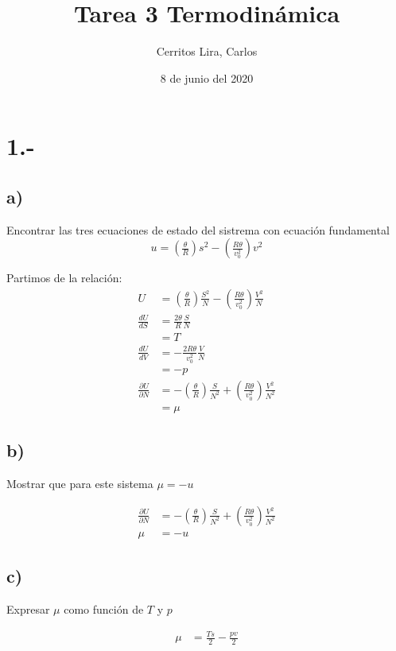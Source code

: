 \documentclass{article}
\title{Tarea 3 Termodinámica}
\author{Cerritos Lira, Carlos}
\date{8 de junio del 2020}
\begin{document}
\maketitle
\section*{1.-}
\subsection*{a)}
Encontrar las tres ecuaciones de estado del sistrema con ecuación fundamental
\[ u = (\tfrac{\theta}{R})s^2 - (\tfrac{R\theta}{v_0^2})v^2 \]
\begin{tcolorbox}
    Partimos de la relación:
    \begin{align*}
        U 
        &= (\tfrac{\theta}{R}) \tfrac{S^2}{N} - (\tfrac{R\theta}{v_0^2})\tfrac{V^2}{N} \\
        \tfrac{dU}{dS} 
        &= \tfrac{2\theta}{R}\tfrac{S}{N} \\
        &= T \\
        \tfrac{dU}{dV}
        &= -\tfrac{2R\theta}{v_0^2}\tfrac{V}{N} \\
        &= -p \\
        \tfrac{\partial U}{\partial N} 
        &= -(\tfrac{\theta}{R})\tfrac{S}{N^2}+(\tfrac{R\theta}{v_0^2})\tfrac{V^2}{N^2} \\
        &= \mu
    \end{align*}
\end{tcolorbox}

\subsection*{b)}
Mostrar que para este sistema $\mu = -u$
\begin{tcolorbox}
    \begin{align*}
        \tfrac{\partial U}{\partial N} &= -(\tfrac{\theta}{R})\tfrac{S}{N^2}+(\tfrac{R\theta}{v_0^2})\tfrac{V^2}{N^2} \\
        \mu &= -u    
    \end{align*}
\end{tcolorbox}

\subsection*{c)}
Expresar $\mu$ como función de $T$ y $p$
\begin{tcolorbox}
    \begin{align*}
        \mu &= \tfrac{Ts}{2} - \tfrac{pv}{2}
    \end{align*}
\end{tcolorbox}
\end{document}
